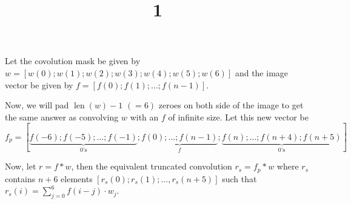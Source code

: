 \documentclass[a4paper,landscape]{article}
\title{1}
\date{}
\begin{document}
\maketitle
Let the covolution mask be given by $w=[w(0); w(1); w(2); w(3); w(4); w(5); w(6)]$ and
the image vector be given by $f=[f(0);f(1);\ldots;f(n-1)]$.

Now, we will pad $\operatorname{len}(w)-1$ $(=6)$ zeroes on both side of the image to get the same answer as convolving $w$ with an $f$ of infinite size. Let this new vector be  \[f_p=[\underbrace{f(-6); f(-5);\ldots; f(-1)}_{0\text{'s}}; \underbrace{f(0); \ldots; f(n-1)}_{f}; \underbrace{f(n); \ldots; f(n+4); f(n+5)}_{0\text{'s}}]\]

Now, let $r=f \ast w$, then the equivalent truncated convolution $r_s=f_p \ast w$ where $r_s$  contains $n+6$ elements $[r_s(0); r_s(1); \ldots, r_s(n+5)]$ such that $r_s(i)=\displaystyle\sum_{j = 0}^{6} f(i-j)\cdot w_j $.
\end{document}
